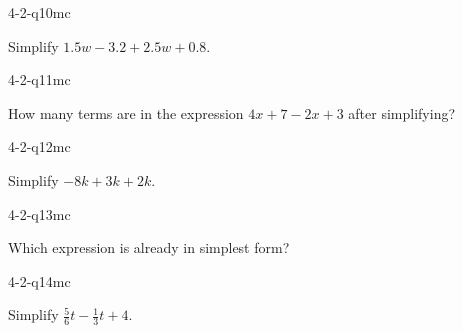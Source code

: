\begin{practiceQuestion}{4-2-q10}{mc}
\begin{questionText}
Simplify $1.5w - 3.2 + 2.5w + 0.8$.
\end{questionText}
\end{practiceQuestion}

\begin{practiceQuestion}{4-2-q11}{mc}
\begin{questionText}
How many terms are in the expression $4x + 7 - 2x + 3$ after simplifying?
\end{questionText}
\end{practiceQuestion}

\begin{practiceQuestion}{4-2-q12}{mc}
\begin{questionText}
Simplify $-8k + 3k + 2k$.
\end{questionText}
\end{practiceQuestion}

\begin{practiceQuestion}{4-2-q13}{mc}
\begin{questionText}
Which expression is already in simplest form?
\end{questionText}
\end{practiceQuestion}

\begin{practiceQuestion}{4-2-q14}{mc}
\begin{questionText}
Simplify $\frac{5}{6}t - \frac{1}{3}t + 4$.
\end{questionText}
\end{practiceQuestion}

